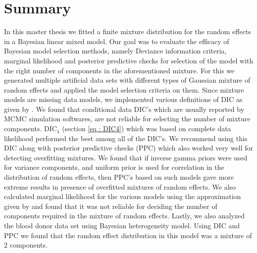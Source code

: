 
\chapter{Summary}
\label{ch : summary}

In this master thesis we fitted a finite mixture distribution for the random effects in a Bayesian linear mixed model. Our goal was to evaluate the efficacy of Bayesian model selection methods, namely Deviance information criteria, marginal likelihood and posterior predictive checks for selection of the model with the right number of components in the aforementioned mixture. For this we generated multiple artificial data sets with different types of Gaussian mixture of random effects and applied the model selection criteria on them. Since mixture models are missing data models, we implemented various definitions of DIC as given by \citet{celeux_deviance_2006}. We found that conditional data DIC's which are usually reported by MCMC simulation softwares, are not reliable for selecting the number of mixture components. $\text{DIC}_4$ (section \ref{eq : DIC4}) which was based on complete data likelihood performed the best among all of the DIC's. We recommend using this DIC along with posterior predictive checks (PPC) which also worked very well for detecting overfitting mixtures. We found that if inverse gamma priors were used for variance components, and uniform prior is used for correlation in the distribution of random effects, then PPC's based on such models gave more extreme results in presence of overfitted mixtures of random effects. We also calculated marginal likelihood for the various models using the approximation given by \citet{chib_marginal_1995} and found that it was not reliable for deciding the number of components required in the mixture of random effects. Lastly, we also analyzed the blood donor data set \citep{nasserinejad_prevalence_2015} using Bayesian heterogeneity model. Using DIC and PPC we found that the random effect distribution in this model was a mixture of 2 components.\\
